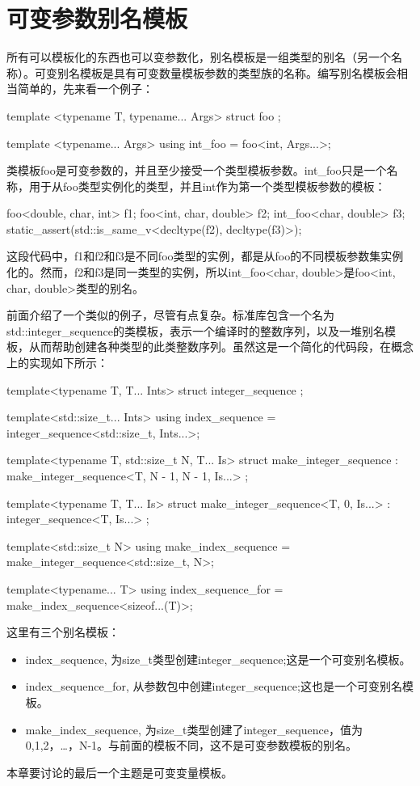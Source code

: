 \section{可变参数别名模板}
所有可以模板化的东西也可以变参数化，别名模板是一组类型的别名（另一个名称）。可变别名模板是具有可变数量模板参数的类型族的名称。编写别名模板会相当简单的，先来看一个例子：

\begin{cpp}
template <typename T, typename... Args>
struct foo
{
};

template <typename... Args>
using int_foo = foo<int, Args...>;
\end{cpp}

类模板foo是可变参数的，并且至少接受一个类型模板参数。int\_foo只是一个名称，用于从foo类型实例化的类型，并且int作为第一个类型模板参数的模板：

\begin{cpp}
foo<double, char, int> f1;
foo<int, char, double> f2;
int_foo<char, double> f3;
static_assert(std::is_same_v<decltype(f2), decltype(f3)>);
\end{cpp}

这段代码中，f1和f2和f3是不同foo类型的实例，都是从foo的不同模板参数集实例化的。然而，f2和f3是同一类型的实例，所以int\_foo<char, double>是foo<int, char, double>类型的别名。

前面介绍了一个类似的例子，尽管有点复杂。标准库包含一个名为std::integer\_sequence的类模板，表示一个编译时的整数序列，以及一堆别名模板，从而帮助创建各种类型的此类整数序列。虽然这是一个简化的代码段，在概念上的实现如下所示：

\begin{cpp}
template<typename T, T... Ints>
struct integer_sequence
{};

template<std::size_t... Ints>
using index_sequence = integer_sequence<std::size_t,
								        Ints...>;

template<typename T, std::size_t N, T... Is>
struct make_integer_sequence :
	make_integer_sequence<T, N - 1, N - 1, Is...>
{};

template<typename T, T... Is>
struct make_integer_sequence<T, 0, Is...> :
	integer_sequence<T, Is...>
{};

template<std::size_t N>
using make_index_sequence = make_integer_sequence<std::size_t,
												  N>;

template<typename... T>
using index_sequence_for =
	make_index_sequence<sizeof...(T)>;
\end{cpp}

这里有三个别名模板：

\begin{itemize}
\item
index\_sequence, 为size\_t类型创建integer\_sequence;这是一个可变别名模板。

\item
index\_sequence\_for, 从参数包中创建integer\_sequence;这也是一个可变别名模板。

\item
make\_index\_sequence, 为size\_t类型创建了integer\_sequence，值为0,1,2，…，N-1。与前面的模板不同，这不是可变参数模板的别名。
\end{itemize}

本章要讨论的最后一个主题是可变变量模板。











